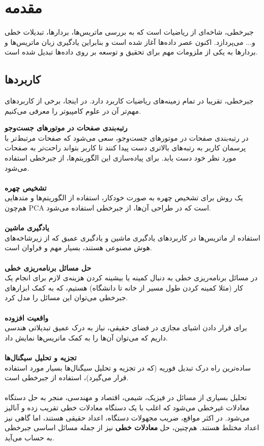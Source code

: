 \chapter{مقدمه}

جبرخطی، شاخه‌ای از ریاضیات است که به بررسی ماتریس‌ها، بردارها، تبدیلات خطی و... می‌پردازد. اکنون عصر داده‌ها آغاز شده است و بنابراین یادگیری زبان ماتریس‌ها و بردارها به یکی از ملزومات مهم برای تحقیق و توسعه بر روی داده‌ها تبدیل شده است. 

\section{کاربردها}
جبرخطی، تقریبا در تمام زمینه‌های ریاضیات کاربرد دارد. در اینجا، برخی از کاربردهای مهم‌تر آن در علوم کامپیوتر را معرفی می‌کنیم.

\textbf{رتبه‌بندی صفحات در موتورهای جست‌وجو}\\
در رتبه‌بندی صفحات در موتورهای جست‌و‌جو، سعی می‌شود که صفحات مرتبط‌تر با پرسمان کاربر به رتبه‌های بالاتری دست پیدا کنند تا کاربر بتواند راحت‌تر به صفحات مورد نظر خود دست یابد. برای پیاده‌سازی این الگوریتم‌ها، از جبرخطی استفاده می‌شود.\\\\
\textbf{تشخیص چهره}\\
یک روش برای تشخیص چهره به صورت خودکار، استفاده از الگوریتم‌ها و متدهایی هم‌چون PCA است که در طراحی آن‌ها، از جبرخطی استفاده می‌شود.\\\\
\textbf{یادگیری ماشین}\\
استفاده از ماتریس‌ها در کاربردهای یادگیری ماشین و یادگیری عمیق که از زیرشاخه‌های هوش مصنوعی هستند، بسیار مهم و فراوان است.\\\\
\textbf{حل مسائل برنامه‌ریزی خطی}\\
در مسائل برنامه‌ریزی خطی به دنبال کمینه یا بیشینه کردن هزینه‌ی لازم برای انجام یک کار (مثلا کمینه کردن طول مسیر از خانه تا دانشگاه) هستیم، که به کمک ابزارهای جبرخطی می‌توان این مسائل را مدل کرد.\\\\
\textbf{واقعیت افزوده}\\
برای قرار دادن اشیای مجازی در فضای حقیقی، نیاز به درک عمیق تبدیلاتی هندسی داریم که می‌توان آن‌ها را به کمک ماتریس‌ها نمایش داد.\\\\
\textbf{تجزیه و تحلیل سیگنال‌ها}\\
ساده‌ترین راه درک تبدیل فوریه (که در تجزیه و تحلیل سیگنال‌ها بسیار مورد استفاده قرار می‌گیرد)، استفاده از جبرخطی است.\\\\
تحلیل بسیاری از مسائل در فیزیک، شیمی، اقتصاد و مهندسی، منجر به حل دستگاه معادلات غیر‌خطی می‌شود که اغلب با یک دستگاه معادلات خطی تقریب زده و آنالیز می‌شود. در اکثر مواقع، ضریب مجهولات دستگاه، اعداد حقیقی هستند، اما گاهی نیز اعداد مختلط هستند. هم‌چنین، حل \textbf{معادلات خطی} نیز از جمله مسائل اساسی جبر‌خطی به حساب می‌آید.

